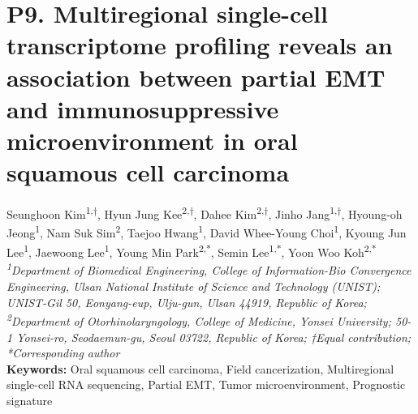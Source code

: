 \section*{P9. Multiregional single-cell transcriptome profiling reveals an association between partial EMT and immunosuppressive microenvironment in oral squamous cell carcinoma}

\begin{center}
Seunghoon Kim\textsuperscript{1,†}, Hyun Jung Kee\textsuperscript{2,†}, Dahee Kim\textsuperscript{2,†}, Jinho Jang\textsuperscript{1,†}, Hyoung-oh Jeong\textsuperscript{1}, Nam Suk Sim\textsuperscript{2}, Taejoo Hwang\textsuperscript{1}, David Whee-Young Choi\textsuperscript{1}, Kyoung Jun Lee\textsuperscript{1}, Jaewoong Lee\textsuperscript{1}, Young Min Park\textsuperscript{2,*}, Semin Lee\textsuperscript{1,*}, Yoon Woo Koh\textsuperscript{2,*} \\
\vspace{0.2cm}
\textit{\textsuperscript{1}Department of Biomedical Engineering, College of Information-Bio Convergence Engineering, Ulsan National Institute of Science and Technology (UNIST); UNIST-Gil 50, Eonyang-eup, Ulju-gun, Ulsan 44919, Republic of Korea; \textsuperscript{2}Department of Otorhinolaryngology, College of Medicine, Yonsei University; 50-1 Yonsei-ro, Seodaemun-gu, Seoul 03722, Republic of Korea; †Equal contribution; *Corresponding author} \\
\vspace{0.2cm}
\textbf{Keywords:} Oral squamous cell carcinoma, Field cancerization, Multiregional single-cell RNA sequencing, Partial EMT, Tumor microenvironment, Prognostic signature
\end{center}

